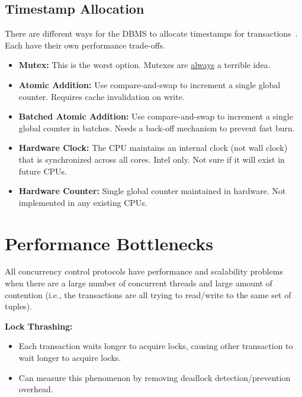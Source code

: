 \documentclass[11pt]{article}
\begin{document}
\subsection*{Timestamp Allocation}
There are different ways for the DBMS to allocate timestamps for transactions~\cite{p209-yu}. Each 
have their own performance trade-offs.
\begin{itemize}
    \item \textbf{Mutex:}
    This is the worst option. Mutexes are \underline{always} a terrible idea.
    
    \item \textbf{Atomic Addition:}
    Use compare-and-swap to increment a single global counter. Requires cache invalidation on write.
    
    \item \textbf{Batched Atomic Addition:}
    Use compare-and-swap to increment a single global counter in batches.
    Needs a back-off mechanism to prevent fast burn.

    \item \textbf{Hardware Clock:}
    The CPU maintains an internal clock (not wall clock) that is synchronized across all cores.
    Intel only. Not sure if it will exist in future CPUs.
    
    \item \textbf{Hardware Counter:}
    Single global counter maintained in hardware. Not implemented in any existing CPUs.
\end{itemize}

\section{Performance Bottlenecks}
All concurrency control protocols have performance and scalability problems when there are a large 
number of concurrent threads and large amount of contention (i.e., the transactions are all trying 
to read/write to the same set of tuples).

\textbf{Lock Thrashing:}
\begin{itemize}
    \item
    Each transaction waits longer to acquire locks, causing other transaction to wait longer to 
    acquire locks.
    
    \item
    Can measure this phenomenon by removing deadlock detection/prevention overhead.
\end{itemize}
    
\end{document}
